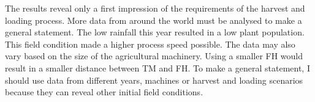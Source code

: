 The results reveal only a first impression of the requirements of the harvest and loading process.
More data from around the world must be analysed to make a general statement.
The low rainfall this year resulted in a low plant population.
This field condition made a higher process speed possible.
The data may also vary based on the size of the agricultural machinery.
Using a smaller \ac{FH} would result in a smaller distance between \ac{TM} and \ac{FH}.
To make a general statement, I should use data from different years, machines or harvest and loading scenarios
because they can reveal other initial field conditions.

